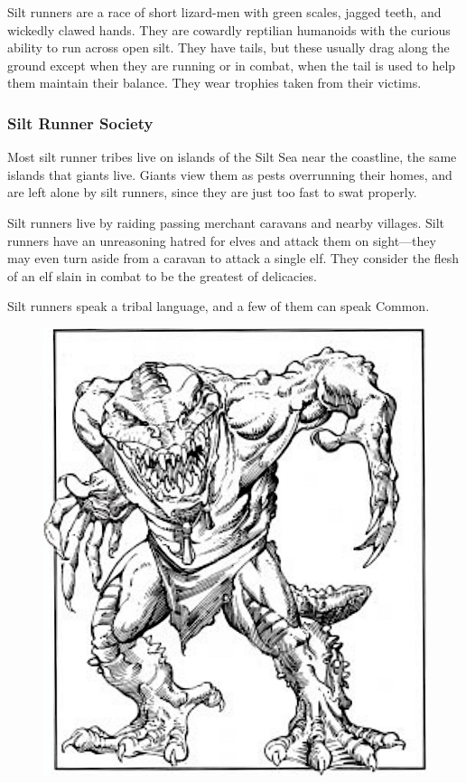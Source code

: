 Silt runners are a race of short lizard-men with green scales, jagged teeth, and wickedly clawed hands. They are cowardly reptilian humanoids with the curious ability to run across open silt. They have tails, but these usually drag along the ground except when they are running or in combat, when the tail is used to help them maintain their balance. They wear trophies taken from their victims.

\subsubsection{Silt Runner Society}
Most silt runner tribes live on islands of the Silt Sea near the coastline, the same islands that giants live. Giants view them as pests overrunning their homes, and are left alone by silt runners, since they are just too fast to swat properly.

Silt runners live by raiding passing merchant caravans and nearby villages. Silt runners have an unreasoning hatred for elves and attack them on sight---they may even turn aside from a caravan to attack a single elf. They consider the flesh of an elf slain in combat to be the greatest of delicacies.

Silt runners speak a tribal language, and a few of them can
speak Common.

\begin{figure}[t!]
\centering
\includegraphics[width=\columnwidth]{images/silt-runner.png}
\WOTC
\end{figure}

